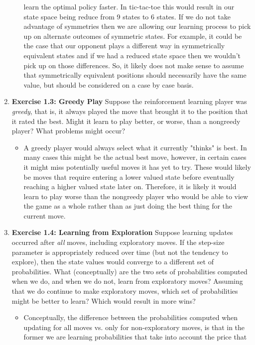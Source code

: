 \documentclass[12pt]{article}
\begin{document}
\begin{enumerate}[label=(\alph*)]
\begin{itemize}
    learn the optimal policy faster. In tic-tac-toe this would result in our state space being reduce from 9
    states to 6 states. If we do not take advantage of symmetries then we are allowing our learning process to 
    pick up on alternate outcomes of symmetric states. For example, it could be the case that our opponent plays a
    different way in symmetrically equivalent states and if we had a reduced state space then we wouldn't pick up
    on those differences. So, it likely does not make sense to assume that symmetrically equivalent positions should 
    necessarily have the same value, but should be considered on a case by case basis.
  \end{itemize}
  \item \textbf{Exercise 1.3: Greedy Play} Suppose the reinforcement learning player was \textit{greedy},
  that is, it always played the move that brought it to the position that it rated the best. Might it
  learn to play better, or worse, than a nongreedy player? What problems might occur?
  \begin{itemize}
    \item A greedy player would always select what it currently "thinks" is best. In many cases this might be
    the actual best move, however, in certain cases it might miss potentially useful moves it has yet to try.
    These would likely be moves that require entering a lower valued state before eventually reaching a higher
    valued state later on. Therefore, it is likely it would learn to play worse than the nongreedy player who
    would be able to view the game as a whole rather than as just doing the best thing for the current move.
  \end{itemize}
  \item \textbf{Exercise 1.4: Learning from Exploration} Suppose learning updates occurred after \textit{all}
  moves, including exploratory moves. If the step-size parameter is appropriately reduced over time (but not
  the tendency to explore), then the state values would converge to a different set of probabilities. What
  (conceptually) are the two sets of probabilities computed when we do, and when we do not, learn from exploratory
  moves? Assuming that we do continue to make exploratory moves, which set of probabilities might be better to learn?
  Which would result in more wins?
  \begin{itemize}
    \item Conceptually, the difference between the probabilities computed when updating for all moves vs. only for
    non-exploratory moves, is that in the former we are learning probabilities that take into account the price that

\end{itemize}
\end{enumerate}
\end{document}
